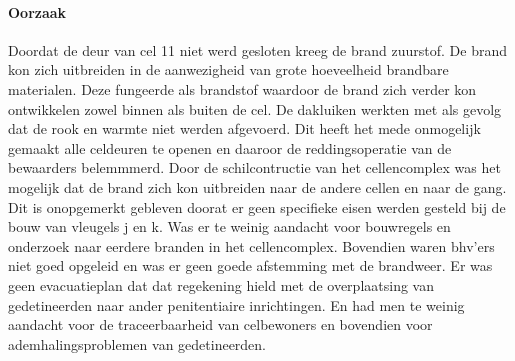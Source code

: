 \documentclass{article}
\begin{document}
	\paragraph{Oorzaak}
	\newline \indent 
	Doordat de deur van cel 11 niet werd gesloten kreeg de brand zuurstof. De brand kon zich  uitbreiden in de aanwezigheid van grote hoeveelheid brandbare materialen.
	Deze fungeerde als brandstof waardoor de brand zich verder kon ontwikkelen zowel binnen als buiten de cel. De dakluiken werkten met als gevolg dat de rook en warmte niet werden afgevoerd. Dit heeft het mede onmogelijk gemaakt alle celdeuren te openen en daaroor de reddingsoperatie van de bewaarders belemmmerd. Door de schilcontructie van het cellencomplex was het mogelijk dat de brand zich kon uitbreiden naar de andere cellen en naar de gang.\\
	Dit is onopgemerkt gebleven doorat er geen specifieke eisen werden gesteld bij de bouw van vleugels j en k. Was er te weinig aandacht voor bouwregels en onderzoek naar eerdere branden in het cellencomplex. Bovendien waren bhv'ers niet goed opgeleid en was er geen goede afstemming met de brandweer.
	Er was geen evacuatieplan dat dat regekening hield met de overplaatsing van gedetineerden naar ander penitentiaire inrichtingen. En had men te weinig aandacht voor de traceerbaarheid van celbewoners en bovendien voor ademhalingsproblemen van gedetineerden.
\end{document}
